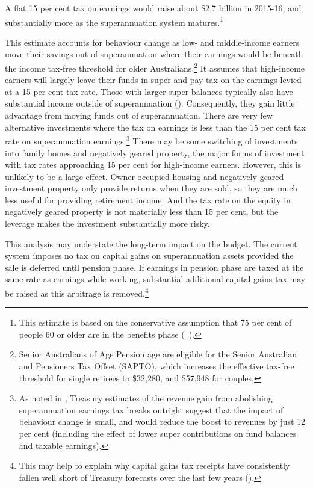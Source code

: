 A flat 15 per cent tax on earnings would raise about \$2.7 billion in 2015-16, and substantially more as the superannuation system matures.\footnote{This estimate is based on the conservative assumption that 75 per cent of people 60 or older are in the benefits phase (\gao\ \textcite{ABS2013t}).}

This estimate accounts for behaviour change as low- and middle-income earners move their savings out of superannuation where their earnings would be beneath the income tax-free threshold for older Australians.\footnote{Senior Australians of Age Pension age are eligible for the Senior Australian and Pensioners Tax Offset (SAPTO), which increases the effective tax-free threshold for single retirees to \$32,280, and \$57,948 for couples.}  It assumes that high-income earners will largely leave their funds in super and pay tax on the earnings levied at a 15 per cent tax rate. Those with larger super balances typically also have substantial income outside of superannuation (). Consequently, they gain little advantage from moving funds out of superannuation. There are very few alternative investments where the tax on earnings is less than the 15 per cent tax rate on superannuation earnings.\footnote{As noted in , Treasury estimates of the revenue gain from abolishing superannuation earnings tax breaks outright suggest that the impact of behaviour change is small, and would reduce the boost to revenues by just 12 per cent (including the effect of lower super contributions on fund balances and taxable earnings).}  There may be some switching of investments into family homes and negatively geared property, the major forms of investment with tax rates approaching 15 per cent for high-income earners. However, this is unlikely to be a large effect. Owner occupied housing and negatively geared investment property only provide returns when they are sold, so they are much less useful for providing retirement income. And the tax rate on the equity in negatively geared property is not materially less than 15 per cent, but the leverage makes the investment substantially more risky.  

This analysis may understate the long-term impact on the budget. The current system imposes no tax on capital gains on superannuation assets provided the sale is deferred until pension phase. If earnings in pension phase are taxed at the same rate as earnings while working, substantial additional capital gains tax may be raised as this arbitrage is removed.\footnote{This may help to explain why capital gains tax receipts have consistently fallen well short of Treasury forecasts over the last few years (\textcite[][51]{Treasury2012ReviewMacroRevenueForecasts}).}

